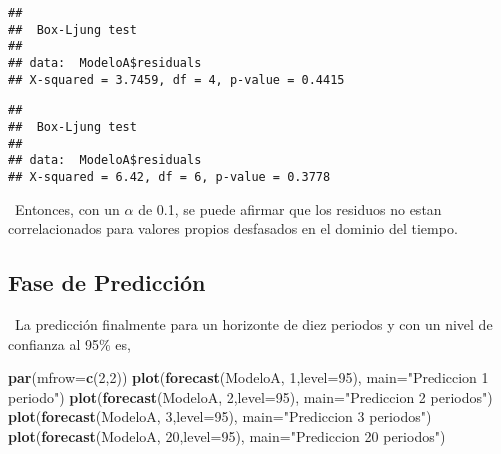 \documentclass[]{article}
\newenvironment{Shaded}{\begin{snugshade}}{\end{snugshade}}
\newcommand{\DataTypeTok}[1]{\textcolor[rgb]{0.13,0.29,0.53}{#1}}
\newcommand{\DecValTok}[1]{\textcolor[rgb]{0.00,0.00,0.81}{#1}}
\newcommand{\KeywordTok}[1]{\textcolor[rgb]{0.13,0.29,0.53}{\textbf{#1}}}
\newcommand{\NormalTok}[1]{#1}
\newcommand{\OperatorTok}[1]{\textcolor[rgb]{0.81,0.36,0.00}{\textbf{#1}}}
\newcommand{\StringTok}[1]{\textcolor[rgb]{0.31,0.60,0.02}{#1}}
\begin{document}
\begin{verbatim}
## 
##  Box-Ljung test
## 
## data:  ModeloA$residuals
## X-squared = 3.7459, df = 4, p-value = 0.4415
\end{verbatim}

\begin{Shaded}
\end{Shaded}

\begin{verbatim}
## 
##  Box-Ljung test
## 
## data:  ModeloA$residuals
## X-squared = 6.42, df = 6, p-value = 0.3778
\end{verbatim}

~Entonces, con un \(\alpha\) de 0.1, se puede afirmar que los residuos
no estan correlacionados para valores propios desfasados en el dominio
del tiempo.

\hypertarget{fase-de-prediccion}{%
\subsection{Fase de Predicción}\label{fase-de-prediccion}}

~La predicción finalmente para un horizonte de diez periodos y con un
nivel de confianza al 95\% es,

\begin{Shaded}
\begin{Highlighting}[]
\KeywordTok{par}\NormalTok{(}\DataTypeTok{mfrow=}\KeywordTok{c}\NormalTok{(}\DecValTok{2}\NormalTok{,}\DecValTok{2}\NormalTok{))}
\KeywordTok{plot}\NormalTok{(}\KeywordTok{forecast}\NormalTok{(ModeloA, }\DecValTok{1}\NormalTok{,}\DataTypeTok{level=}\DecValTok{95}\NormalTok{), }\DataTypeTok{main=}\StringTok{"Prediccion 1 periodo"}\NormalTok{)}
\KeywordTok{plot}\NormalTok{(}\KeywordTok{forecast}\NormalTok{(ModeloA, }\DecValTok{2}\NormalTok{,}\DataTypeTok{level=}\DecValTok{95}\NormalTok{), }\DataTypeTok{main=}\StringTok{"Prediccion 2 periodos"}\NormalTok{)}
\KeywordTok{plot}\NormalTok{(}\KeywordTok{forecast}\NormalTok{(ModeloA, }\DecValTok{3}\NormalTok{,}\DataTypeTok{level=}\DecValTok{95}\NormalTok{), }\DataTypeTok{main=}\StringTok{"Prediccion 3 periodos"}\NormalTok{)}
\KeywordTok{plot}\NormalTok{(}\KeywordTok{forecast}\NormalTok{(ModeloA, }\DecValTok{20}\NormalTok{,}\DataTypeTok{level=}\DecValTok{95}\NormalTok{), }\DataTypeTok{main=}\StringTok{"Prediccion 20 periodos"}\NormalTok{)}
\end{Highlighting}
\end{Shaded}
\end{document}
